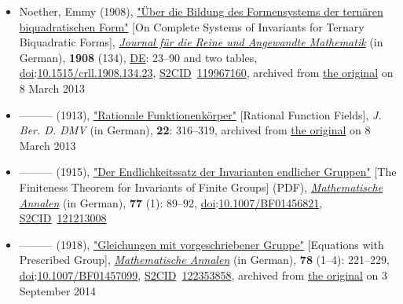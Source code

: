 \begin{itemize}
\tightlist
\item
  Noether, Emmy (1908), \href{https://web.archive.org/web/20130308102907/http://gdz.sub.uni-goettingen.de/no_cache/dms/load/img/?IDDOC=261200}{"Über die Bildung des Formensystems der ternären biquadratischen Form"} {{[}}On Complete Systems of Invariants for Ternary Biquadratic Forms{{]}}, \emph{\href{https://en.wikipedia.org/wiki/Journal_für_die_Reine_und_Angewandte_Mathematik}{Journal für die Reine und Angewandte Mathematik}} (in German), \textbf{1908} (134), \href{https://en.wikipedia.org/wiki/Germany}{DE}: 23--90 and two tables, \href{https://en.wikipedia.org/wiki/Doi_(identifier)}{doi}:\href{https://doi.org/10.1515\%2Fcrll.1908.134.23}{10.1515/crll.1908.134.23}, \href{https://en.wikipedia.org/wiki/S2CID_(identifier)}{S2CID}{~}\href{https://api.semanticscholar.org/CorpusID:119967160}{119967160}, archived from \href{http://gdz.sub.uni-goettingen.de/no_cache/dms/load/img/?IDDOC=261200}{the original} on 8 March 2013{}
\item
  {---}{---}{---} (1913), \href{https://web.archive.org/web/20130308102912/http://gdz.sub.uni-goettingen.de/no_cache/dms/load/img/?IDDOC=244058}{"Rationale Funktionenkörper"} {{[}}Rational Function Fields{{]}}, \emph{J. Ber. D. DMV} (in German), \textbf{22}: {316--}319, archived from \href{http://gdz.sub.uni-goettingen.de/no_cache/dms/load/img/?IDDOC=244058}{the original} on 8 March 2013{}
\item
  {---}{---}{---} (1915), \href{http://www.digizeitschriften.de/download/PPN235181684_0077/log12.pdf}{"Der Endlichkeitssatz der Invarianten endlicher Gruppen"} {{[}}The Finiteness Theorem for Invariants of Finite Groups{{]}} {(PDF)}, \emph{\href{https://en.wikipedia.org/wiki/Mathematische_Annalen}{Mathematische Annalen}} (in German), \textbf{77} (1): {89--}92, \href{https://en.wikipedia.org/wiki/Doi_(identifier)}{doi}:\href{https://doi.org/10.1007\%2FBF01456821}{10.1007/BF01456821}, \href{https://en.wikipedia.org/wiki/S2CID_(identifier)}{S2CID}{~}\href{https://api.semanticscholar.org/CorpusID:121213008}{121213008}{}
\item
  {---}{---}{---} (1918), \href{https://web.archive.org/web/20140903092131/http://gdz.sub.uni-goettingen.de/index.php?id=11&PPN=GDZPPN002266733&L=1}{"Gleichungen mit vorgeschriebener Gruppe"} {{[}}Equations with Prescribed Group{{]}}, \emph{\href{https://en.wikipedia.org/wiki/Mathematische_Annalen}{Mathematische Annalen}} (in German), \textbf{78} ({1--}4): {221--}229, \href{https://en.wikipedia.org/wiki/Doi_(identifier)}{doi}:\href{https://doi.org/10.1007\%2FBF01457099}{10.1007/BF01457099}, \href{https://en.wikipedia.org/wiki/S2CID_(identifier)}{S2CID}{~}\href{https://api.semanticscholar.org/CorpusID:122353858}{122353858}, archived from \href{http://gdz.sub.uni-goettingen.de/index.php?id=11&PPN=GDZPPN002266733&L=1}{the original} on 3 September 2014{}

\end{itemize}
